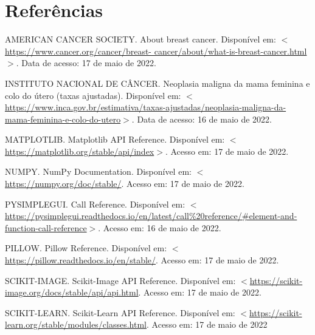 \section*{Referências}

\noindent
AMERICAN CANCER SOCIETY. About breast cancer. Disponível em: $<$\url{https://www.cancer.org/cancer/breast-
cancer/about/what-is-breast-cancer.html}$>$. Data de acesso: 17 de maio de 2022.

\noindent
INSTITUTO NACIONAL DE CÂNCER. Neoplasia maligna da mama feminina e colo do útero (taxas ajustadas). Disponível em: $<$\url{https://www.inca.gov.br/estimativa/taxas-ajustadas/neoplasia-maligna-da-mama-feminina-e-colo-do-utero}$>$. Data de acesso: 16 de maio de 2022.

\noindent
MATPLOTLIB. Matplotlib API Reference. Disponível em: $<$\url{https://matplotlib.org/stable/api/index}$>$. Acesso em: 17 de maio de 2022.

\noindent
NUMPY. NumPy Documentation. Disponível em: $<$\url{https://numpy.org/doc/stable/}\>. Acesso em: 17 de maio de 2022.

\noindent
PYSIMPLEGUI. Call Reference. Disponível em: $<$\url{https://pysimplegui.readthedocs.io/en/latest/call\%20reference/#element-and-function-call-reference}$>$. Acesso em: 16 de maio de 2022.

\noindent
PILLOW. Pillow Reference. Disponível em: $<$\url{https://pillow.readthedocs.io/en/stable/}\>. Acesso em: 17 de maio de 2022.

\noindent
SCIKIT-IMAGE. Scikit-Image API Reference. Disponível em: $<$\url{https://scikit-image.org/docs/stable/api/api.html}\>. Acesso em: 17 de maio de 2022.

\noindent
SCIKIT-LEARN. Scikit-Learn API Reference. Disponível em: $<$\url{https://scikit-learn.org/stable/modules/classes.html}\>. Acesso em: 17 de maio de 2022

